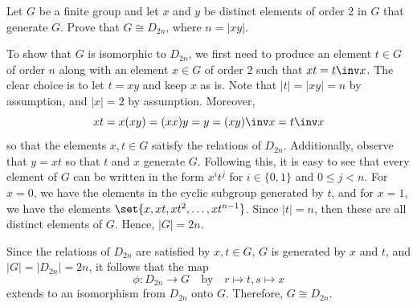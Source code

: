 \begin{exercise}\label{ex1.6.24}
    Let $G$ be a finite group and let $x$ and $y$ be distinct elements of order 2 in $G$ that generate $G$. Prove that $G \cong D_{2n}$, where $n = |xy|$.
\end{exercise}

\begin{sol}
    To show that $G$ is isomorphic to $D_{2n}$, we first need to produce an element $t \in G$ of order $n$ along with an element $x \in G$ of order 2 such that $xt = t\inv x$. The clear choice is to let $t = xy$ and keep $x$ as is. Note that $|t| = |xy| = n$ by assumption, and $|x| = 2$ by assumption. Moreover,
    \[xt = x(xy) = (xx)y = y = (xy)\inv x = t\inv x\]
    so that the elements $x, t \in G$ satisfy the relations of $D_{2n}$. Additionally, observe that $y = xt$ so that $t$ and $x$ generate $G$. Following this, it is easy to see that every element of $G$ can be written in the form $x^i t^j$ for $i \in \{0, 1\}$ and $0 \leq j < n$. For $x = 0$, we have the elements in the cyclic subgroup generated by $t$, and for $x = 1$, we have the elements $\set{x, xt, xt^2, \ldots, xt^{n-1}}$. Since $|t| = n$, then these are all distinct elements of $G$. Hence, $|G| = 2n$.

    Since the relations of $D_{2n}$ are satisfied by $x, t \in G$, $G$ is generated by $x$ and $t$, and $|G| = |D_{2n}| = 2n$, it follows that the map
    \[\phi : D_{2n} \to G \quad \text{by} \quad r \mapsto t, s \mapsto x\]
    extends to an isomorphism from $D_{2n}$ onto $G$. Therefore, $G \cong D_{2n}$.
\end{sol}

